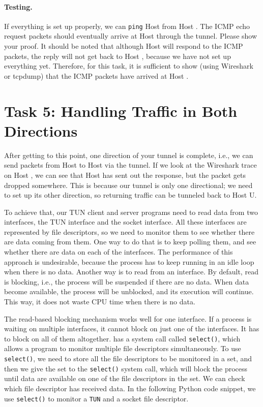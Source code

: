  

\paragraph{Testing.} If everything is set up properly, we can \texttt{ping}
Host \hostv from Host \hostu. The ICMP echo request packets should eventually arrive at Host \hostv
through the tunnel. 
Please show your proof. 
It should be noted that although Host \hostv will respond to the ICMP packets,
the reply will not get back to Host \hostu, because we have not set up everything yet. 
Therefore, for this task, it is sufficient to
show (using Wireshark or tcpdump) that the ICMP packets have arrived at Host \hostv.





\section{Task 5: Handling Traffic in Both Directions}


After getting to this point, one direction of your tunnel is complete, i.e.,
we can send packets from Host \hostu to Host \hostv via the tunnel. If we look at the
Wireshark trace on Host \hostv, we can see that Host \hostv has sent out the 
response, but the packet gets dropped somewhere. This is because 
our tunnel is only one directional; we need to set up its other direction, so returning
traffic can be tunneled back to Host U.


To achieve that, our TUN client and server programs need to read data from two interfaces, 
the TUN interface and the socket interface.  
All these interfaces are represented by file descriptors, so we need to
monitor them to see whether there are data coming from them.
One way to do that is to keep polling them, and
see whether there are data on each of the interfaces. The performance of this approach is
undesirable, because the process has to keep running in an idle loop when there is no data.
Another way is to read from an interface.  By default, read is blocking, i.e., the process will
be suspended if there are no data. When data become available, the process will be unblocked,
and its execution will continue. This way, it does not waste CPU time when there is no data.

The read-based blocking mechanism works well for one interface. If a process is waiting on
multiple interfaces, it cannot block on just one of the interfaces. It has to block on all of
them altogether.  \linux has a system call called \texttt{select()}, which
allows a program to monitor multiple file descriptors simultaneously.
To use \texttt{select()}, we need to store all the file descriptors to be monitored in a set,
and then we give the set to the \texttt{select()} system
call, which will block the process until data are available on one of the
file descriptors in the set. We can check which
file descriptor has received data. In the following Python code snippet,
we use \texttt{select()} to monitor a \texttt{TUN} and a socket file
descriptor.



